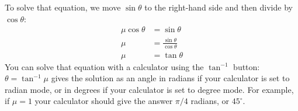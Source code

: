 \documentclass{article}
\begin{document}
\begin{enumerate}
\begin{enumerate}
    To solve that equation, we move $\sin\theta$ to the right-hand
    side and then divide by $\cos\theta$:
    \begin{align*}
      \mu\cos\theta &= \sin\theta \\
      \mu &= \frac{\sin\theta}{\cos\theta} \\
      \mu &= \tan\theta
    \end{align*}
    You can solve that equation with a calculator using the
    $\tan^{-1}$ button: $\theta= \tan^{-1} \mu$ gives the solution as
    an angle in radians if your calculator is set to radian mode, or
    in degrees if your calculator is set to degree mode.  For example,
    if $\mu=1$ your calculator should give the answer $\pi/4$ radians,
    or $45^\circ$.
  \end{enumerate}
\end{enumerate}
\end{document}
